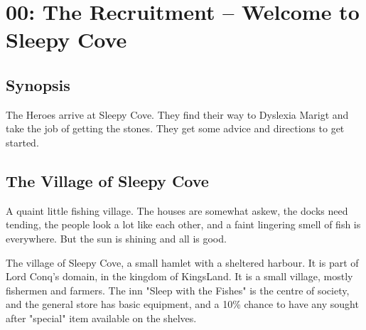 

\clearpage
{}
\section*{00: The Recruitment -- Welcome to Sleepy Cove}
\flushbottom

\subsection*{Synopsis}
The Heroes arrive at Sleepy Cove. They find their way to Dyslexia Marigt and take the job of getting the stones. They get some advice and directions to get started.


\subsection*{The Village of Sleepy Cove}
\begin{readoutloud}
A quaint little fishing village. The houses are somewhat askew, the docks need tending, the people look a lot like each other, and a faint lingering smell of fish is everywhere. But the sun is shining and all is good.
\end{readoutloud}

The village of Sleepy Cove, a small hamlet with a sheltered harbour. It is part of Lord Conq's domain, in the kingdom of KingsLand. It is a small village, mostly fishermen and farmers. The inn "Sleep with the Fishes" is the centre of society, and the general store has basic equipment, and a 10\% chance to have any sought after "special" item available on the shelves.


